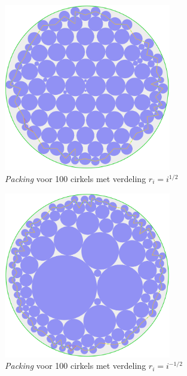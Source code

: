 \documentclass[12pt,a4paper,oneside]{book}
\begin{document}

\begin{figure}
  \centering
  \includegraphics[width=0.65\textwidth]{packing-1div2-100.png}
  \caption{\textit{Packing} voor 100 cirkels met verdeling $r_i=i^{1/2}$}
\end{figure}

\begin{figure}
  \centering
  \includegraphics[width=0.65\textwidth]{packing-neg1div2-100.png}
  \caption{\textit{Packing} voor 100 cirkels met verdeling $r_i=i^{-1/2}$}
\end{figure}
\end{document}
